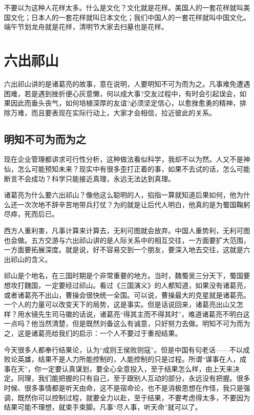 \documentclass[fontset=fandol, a4paper, 12pt, openright]{ctexbook}
\begin{document}
不要以为这种人花样太多。什么是文化？文化就是花样。美国人的一套花样就叫美国文化；日本人的一套花样就叫日本文化；我们中国人的一套花样就叫中国文化。端午节划龙舟就是花样，清明节大家去扫墓也是花样。


\chapter{六出祁山}
六出祁山讲的是诸葛亮的故事，意在说明，人要明知不可为而为之。凡事难免遭遇困难，若是遇到挫折便心灰意懒，何以成大事?交友过程中，有时会引起误会，如果因此而垂头丧气，如何培植深厚的友谊?必须坚定信心，以愈挫愈勇的精神，排除万难，而且要表现在实际行动上，大家才会相信，拉近彼此的关系。

\section{明知不可为而为之}

现在企业管理都讲求可行性分析，这种做法看似科学，我却不以为然。人又不是神仙，怎么可能预知未来？现实中有很多歪打正着的事，如果不去试的话，怎么可能断言不会成功？科学只能接近真理，永远无法达到真理。

诸葛亮为什么要六出祁山？像他这么聪明的人，掐指一算就知道后果如何，他为什么还一次次地不辞辛苦地带兵打仗？为的就是让后代人明白，他真的是为蜀国鞠躬尽瘁，死而后已。

西方人重利害，凡事计算来计算去，无利可图就会放弃。中国人重势利，无利可图也会做。五方交游与六出祁山讲的是人际关系中的相互交往，一方面要扩大范围，一方面要拓展深度。就是说，好不容易交到一个朋友，要深入地去交往，这就是六出祁山的含义。

祁山是个地名，在三国时期是个非常重要的地方。当时，魏蜀吴三分天下，蜀国要想攻打魏国，一定要经过祁山。看过《三国演义》的人都知道，如果没有诸葛亮，或者诸葛亮不出山，曹操会很快统一全国。可以说，曹操最大的克星就是诸葛亮。一个人的力量可以改变天下的局势，这是事实。但是话说回来，诸葛亮出山又怎样？用水镜先生司马徽的话说，诸葛亮“得其主而不得其时”，难道诸葛亮不明白这一点吗？他当然清楚，但是既然刘备这么有诚意，只好努力去做。明知不可为而为之，这是诸葛亮给我们的启示：一个人不要过于重视结果。

今天很多人都奉行结果论，认为“成则王侯败则寇”。但是中国有句老话——不以成败论英雄，结果不是人力所能控制的，人能控制的只是过程。所谓“谋事在人，成事在天”，你一定要认真谋划，要全心全意投入，至于结果怎么样，由上天来决定。同理，我们能把握的只有自己，至于跟别人互动的部分，永远没有把握。很多时候、很多事情都是听天由命，这不是宿命论，也不是消极思想在作怪，我只是强调，既然你可以控制过程，就要全力以赴，至于结果，不要考虑得太多，不要因为结果可能不理想，就束手束脚。凡事“尽人事，听天命”就可以了。
\end{document}
